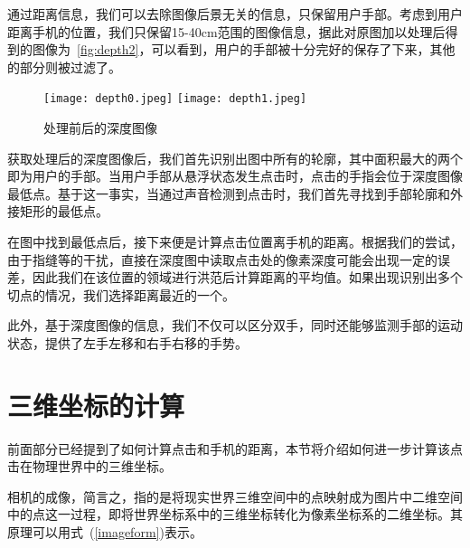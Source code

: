 通过距离信息，我们可以去除图像后景无关的信息，只保留用户手部。考虑到用户距离手机的位置，我们只保留15-40cm范围的图像信息，据此对原图加以处理后得到的图像为~\ref{fig:depth2}，可以看到，用户的手部被十分完好的保存了下来，其他的部分则被过滤了。
\begin{figure}[h]
  \centering%
    {\texttt{[image: depth0.jpeg]}}%
  \hspace{4em}%
      {\texttt{[image: depth1.jpeg]}}
  \caption{处理前后的深度图像}
  \label{fig:depth-image}
\end{figure}

获取处理后的深度图像后，我们首先识别出图中所有的轮廓，其中面积最大的两个即为用户的手部。当用户手部从悬浮状态发生点击时，点击的手指会位于深度图像最低点。基于这一事实，当通过声音检测到点击时，我们首先寻找到手部轮廓和外接矩形的最低点。

在图中找到最低点后，接下来便是计算点击位置离手机的距离。根据我们的尝试，由于指缝等的干扰，直接在深度图中读取点击处的像素深度可能会出现一定的误差，因此我们在该位置的领域进行洪范后计算距离的平均值。如果出现识别出多个切点的情况，我们选择距离最近的一个。

此外，基于深度图像的信息，我们不仅可以区分双手，同时还能够监测手部的运动状态，提供了左手左移和右手右移的手势。

\section{三维坐标的计算}
前面部分已经提到了如何计算点击和手机的距离，本节将介绍如何进一步计算该点击在物理世界中的三维坐标。

相机的成像，简言之，指的是将现实世界三维空间中的点映射成为图片中二维空间中的点这一过程，即将世界坐标系中的三维坐标转化为像素坐标系的二维坐标。其原理可以用式~(\ref{imageform})表示。

